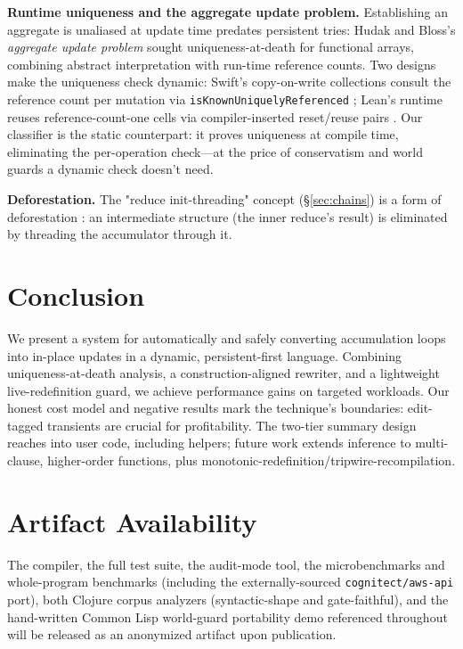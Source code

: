 \documentclass[sigplan,review,anonymous]{acmart}
\begin{document}
\textbf{Runtime uniqueness and the aggregate update problem.} Establishing an aggregate is unaliased at update time predates persistent tries: Hudak and Bloss's \emph{aggregate update problem} \cite{hudak1985aggregate} sought uniqueness-at-death for functional arrays, combining abstract interpretation with run-time reference counts. Two designs make the uniqueness check dynamic: Swift's copy-on-write collections consult the reference count per mutation via \texttt{isKnownUniquelyReferenced} \cite{swift2023cow}; Lean's runtime reuses reference-count-one cells via compiler-inserted reset/reuse pairs \cite{ullrich2019beans}. Our classifier is the static counterpart: it proves uniqueness at compile time, eliminating the per-operation check---at the price of conservatism and world guards a dynamic check doesn't need.

\textbf{Deforestation.} The "reduce init-threading" concept (§\ref{sec:chains}) is a form of deforestation \cite{wadler1990deforestation}: an intermediate structure (the inner reduce's result) is eliminated by threading the accumulator through it.

\section{Conclusion}
\label{sec:conclusion}
We present a system for automatically and safely converting accumulation loops into in-place updates in a dynamic, persistent-first language. Combining uniqueness-at-death analysis, a construction-aligned rewriter, and a lightweight live-redefinition guard, we achieve performance gains on targeted workloads. Our honest cost model and negative results mark the technique's boundaries: edit-tagged transients are crucial for profitability. The two-tier summary design reaches into user code, including helpers; future work extends inference to multi-clause, higher-order functions, plus monotonic-redefinition/tripwire-recompilation.

\section*{Artifact Availability}
The compiler, the full test suite, the audit-mode tool, the microbenchmarks and whole-program benchmarks (including the externally-sourced \texttt{cognitect/aws-api} port), both Clojure corpus analyzers (syntactic-shape and gate-faithful), and the hand-written Common Lisp world-guard portability demo referenced throughout will be released as an anonymized artifact upon publication.
\end{document}
